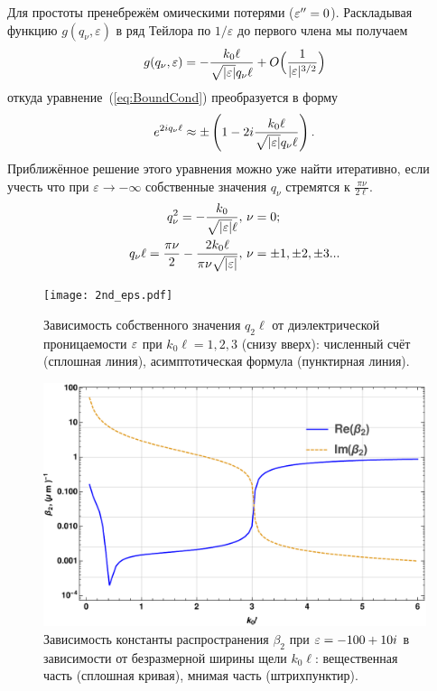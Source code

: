 Для простоты пренебрежём омическими потерями ($\varepsilon'' = 0$). Раскладывая функцию $g(q_\nu,\varepsilon)$ в ряд Тейлора по $1/\varepsilon$ до первого члена мы получаем
\begin{equation*}
g(q_\nu,\varepsilon) = -\frac{k_0 \ell}{\sqrt{\lvert\varepsilon\rvert}q_\nu \ell} + O\Big(\frac{1}{\lvert\varepsilon\rvert^{3/2}}\Big)
\end{equation*}
откуда уравнение~(\ref{eq:BoundCond}) преобразуется в форму
\begin{equation}
e^{2i q_\nu \ell} \approx \pm\left(1 - 2i\frac{k_0 \ell}{\sqrt{\lvert\varepsilon\rvert} q_\nu \ell}\right).
\label{eq:BoundCond_simple}
\end{equation}
Приближённое решение этого уравнения можно уже найти итеративно, если учесть что при $\varepsilon \to -\infty$ собственные значения
$q_\nu$ стремятся к $\frac{\pi \nu}{2 \ell}$.
\begin{align}
q_\nu^2  = -\frac{k_0}{ \sqrt{\lvert\varepsilon\rvert} \ell}, &\ \nu = 0; \nonumber \\
q_\nu \ell = \frac{\pi \nu}{2} - \frac{2k_0\ell}{\pi \nu \sqrt{\lvert\varepsilon\rvert}}, &\ \nu = \pm 1,\pm 2,\pm 3...\label{eq:Eigenvalues_approx}
\end{align}
\begin{figure}
    \begin{center}
    \texttt{[image: 2nd\_eps.pdf]}
      \caption{Зависимость собственного значения $q_2\ell$ от диэлектрической проницаемости $\varepsilon$ при $k_0 \ell = 1,2,3$ (снизу вверх):
      численный счёт (сплошная линия), асимптотическая формула (пунктирная линия).}
      \label{fig:2nd_mode}
    \end{center}
\end{figure}
\begin{figure}
    \centering
    \includegraphics[width=1.0\columnwidth]{figures/betta2_real.pdf}
    \caption{Зависимость константы распространения 
      $\beta_2$ при $\varepsilon = -100+10i$ в зависимости от безразмерной ширины щели $k_0\ell$: вещественная часть (сплошная кривая), мнимая часть (штрихпунктир).}
    \label{fig:betta2}
\end{figure}
